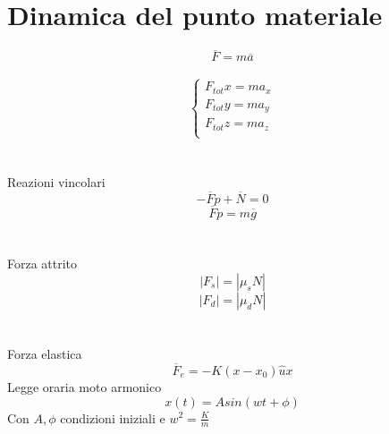 \documentclass{article}
\begin{document}
\section{Dinamica del punto materiale}
\[\overline{F} = m\overline{a}\]\\
\[
\begin{cases}
	F_{tot} x = ma_x \\
	F_{tot} y = ma_y   \\
	F_{tot} z = ma_z   \\
\end{cases}
\]\\\\
\large{Reazioni vincolari}
\[-\overline{F}p + \overline{N} = 0\]
\[\overline{F}p = m\overline{g}\]
\\\\
\large{Forza attrito}
\[|F_s| = |\mu_sN|\]
\[|F_d| = |\mu_dN|\]
\\\\
\large{Forza elastica}
\[\overline{F}_e = -K(x-x_0)\hat{u}x\]
\large{Legge oraria moto armonico}
\[x(t) = A sin(wt + \phi)\]
Con \(A, \phi\) condizioni iniziali e \(w^2 = \frac{K}{m}\)
\end{document}
